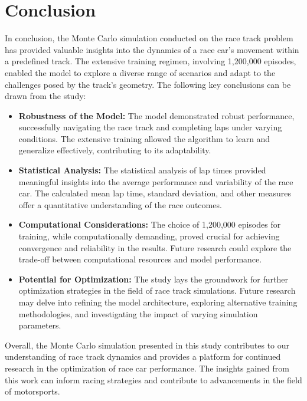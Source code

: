 \documentclass{article}
\begin{document}
\section{Conclusion}
In conclusion, the Monte Carlo simulation conducted on the race track problem has provided valuable insights into the dynamics of a race car's movement within a predefined track. The extensive training regimen, involving 1,200,000 episodes, enabled the model to explore a diverse range of scenarios and adapt to the challenges posed by the track's geometry. The following key conclusions can be drawn from the study:

\begin{itemize}
    \item \textbf{Robustness of the Model:} The model demonstrated robust performance, successfully navigating the race track and completing laps under varying conditions. The extensive training allowed the algorithm to learn and generalize effectively, contributing to its adaptability.

    \item \textbf{Statistical Analysis:} The statistical analysis of lap times provided meaningful insights into the average performance and variability of the race car. The calculated mean lap time, standard deviation, and other measures offer a quantitative understanding of the race outcomes.

    \item \textbf{Computational Considerations:} The choice of 1,200,000 episodes for training, while computationally demanding, proved crucial for achieving convergence and reliability in the results. Future research could explore the trade-off between computational resources and model performance.

    \item \textbf{Potential for Optimization:} The study lays the groundwork for further optimization strategies in the field of race track simulations. Future research may delve into refining the model architecture, exploring alternative training methodologies, and investigating the impact of varying simulation parameters.

\end{itemize}

Overall, the Monte Carlo simulation presented in this study contributes to our understanding of race track dynamics and provides a platform for continued research in the optimization of race car performance. The insights gained from this work can inform racing strategies and contribute to advancements in the field of motorsports.
\end{document}
